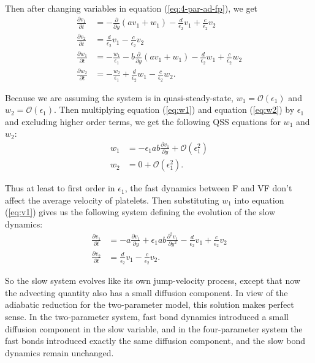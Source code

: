\documentclass{article}
\newcommand{\Pder}[2]{\frac{\partial #1}{\partial #2}}
\begin{document}
Then after changing variables in equation (\ref{eq:4-par-ad-fp}), we
get
\begin{align}
  \Pder{v_1}{t} &= -\Pder{}{y}(a v_1 + w_1) - \frac{d}{\epsilon_2} v_1
                  + \frac{c}{\epsilon_2} v_2 \label{eq:v1} \\
  \Pder{v_2}{t} &= \frac{d}{\epsilon_2} v_1 - \frac{c}{\epsilon_2} v_2
  \label{eq:v2} \\
  \Pder{w_1}{t} &= -\frac{w_1}{\epsilon_1} - b\Pder{}{y} (a v_1 + w_1)
                  - \frac{d}{\epsilon_2} w_1 + \frac{c}{\epsilon_2}
                  w_2 \label{eq:w1} \\
  \Pder{w_2}{t} &= -\frac{w_2}{\epsilon_1} + \frac{d}{\epsilon_2} w_1
                  - \frac{c}{\epsilon_2} w_2. \label{eq:w2}
\end{align}

Because we are assuming the system is in quasi-steady-state, $w_1 =
\mathcal{O}(\epsilon_1)$ and $w_2 = \mathcal{O}(\epsilon_1)$. Then
multiplying equation (\ref{eq:w1}) and equation (\ref{eq:w2}) by
$\epsilon_1$ and excluding higher order terms, we get the following
QSS equations for $w_1$ and $w_2$:
\begin{align}
  w_1 &= -\epsilon_1 a b \Pder{v_1}{y} + \mathcal{O}(\epsilon_1^2) \\
  w_2 &= 0 + \mathcal{O}(\epsilon_1^2).
\end{align}

Thus at least to first order in $\epsilon_1$, the fast dynamics
between F and VF don't affect the average velocity of platelets. Then
substituting $w_1$ into equation (\ref{eq:v1}) gives us the following
system defining the evolution of the slow dynamics:
\begin{align}
  \Pder{v_1}{t} &= -a \Pder{v_1}{y} + \epsilon_1 a b \frac{\partial^2
                  v_1}{\partial y^2} - \frac{d}{\epsilon_2} v_1 +
                  \frac{c}{\epsilon_2} v_2 \\
  \Pder{v_2}{t} &= \frac{d}{\epsilon_2} v_1 - \frac{c}{\epsilon_2} v_2.
\end{align}

So the slow system evolves like its own jump-velocity process, except
that now the advecting quantity also has a small diffusion
component. In view of the adiabatic reduction for the two-parameter
model, this solution makes perfect sense. In the two-parameter system,
fast bond dynamics introduced a small diffusion component in the slow
variable, and in the four-parameter system the fast bonds introduced
exactly the same diffusion component, and the slow bond dynamics
remain unchanged.
\end{document}
